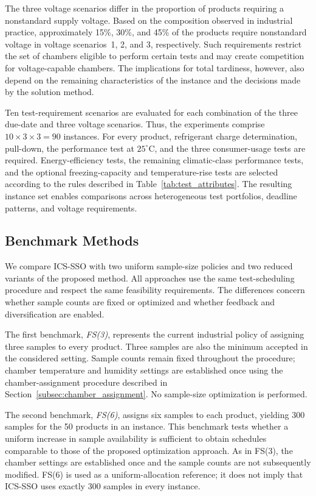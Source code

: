 \documentclass[11pt]{article}
\begin{document}
The three voltage scenarios differ in the proportion of products requiring a nonstandard supply voltage. Based on the composition observed in industrial practice, approximately 15\%, 30\%, and 45\% of the products require nonstandard voltage in voltage scenarios~1, 2, and 3, respectively. Such requirements restrict the set of chambers eligible to perform certain tests and may create competition for voltage-capable chambers. The implications for total tardiness, however, also depend on the remaining characteristics of the instance and the decisions made by the solution method.

Ten test-requirement scenarios are evaluated for each combination of the three due-date and three voltage scenarios. Thus, the experiments comprise \(10\times3\times3=90\) instances. For every product, refrigerant charge determination, pull-down, the performance test at \(25^\circ\mathrm{C}\), and the three consumer-usage tests are required. Energy-efficiency tests, the remaining climatic-class performance tests, and the optional freezing-capacity and temperature-rise tests are selected according to the rules described in Table~\ref{tab:test_attributes}. The resulting instance set enables comparisons across heterogeneous test portfolios, deadline patterns, and voltage requirements.

\subsection{Benchmark Methods}
\label{subsec:methods}

We compare ICS-SSO with two uniform sample-size policies and two reduced variants of the proposed method. All approaches use the same test-scheduling procedure and respect the same feasibility requirements. The differences concern whether sample counts are fixed or optimized and whether feedback and diversification are enabled.

The first benchmark, \emph{FS(3)}, represents the current industrial policy of assigning three samples to every product. Three samples are also the minimum accepted in the considered setting. Sample counts remain fixed throughout the procedure; chamber temperature and humidity settings are established once using the chamber-assignment procedure described in Section~\ref{subsec:chamber_assignment}. No sample-size optimization is performed.

The second benchmark, \emph{FS(6)}, assigns six samples to each product, yielding 300 samples for the 50 products in an instance. This benchmark tests whether a uniform increase in sample availability is sufficient to obtain schedules comparable to those of the proposed optimization approach. As in FS(3), the chamber settings are established once and the sample counts are not subsequently modified. FS(6) is used as a uniform-allocation reference; it does not imply that ICS-SSO uses exactly 300 samples in every instance.
\end{document}
